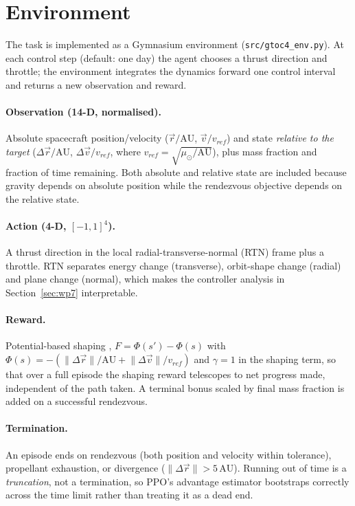 \section{Environment}
\label{sec:env}

The task is implemented as a Gymnasium environment (\texttt{src/gtoc4\_env.py}). At each control
step (default: one day) the agent chooses a thrust direction and throttle; the environment
integrates the dynamics forward one control interval and returns a new observation and reward.

\paragraph{Observation (14-D, normalised).} Absolute spacecraft position/velocity
($\vec r/\mathrm{AU}$, $\vec v/v_{ref}$) and state \emph{relative to the target}
($\Delta\vec r/\mathrm{AU}$, $\Delta\vec v/v_{ref}$, where $v_{ref}=\sqrt{\mu_\odot/\mathrm{AU}}$),
plus mass fraction and fraction of time remaining. Both absolute and relative state are included
because gravity depends on absolute position while the rendezvous objective depends on the
relative state.

\paragraph{Action (4-D, $[-1,1]^4$).} A thrust direction in the local radial-transverse-normal
(RTN) frame plus a throttle. RTN separates energy change (transverse), orbit-shape change
(radial) and plane change (normal), which makes the controller analysis in
Section~\ref{sec:wp7} interpretable.

\paragraph{Reward.} Potential-based shaping \parencite{ng1999policy},
$F = \Phi(s') - \Phi(s)$ with $\Phi(s) = -\left(\lVert\Delta\vec r\rVert/\mathrm{AU} +
\lVert\Delta\vec v\rVert/v_{ref}\right)$ and $\gamma=1$ in the shaping term, so that over a full
episode the shaping reward telescopes to net progress made, independent of the path taken. A
terminal bonus scaled by final mass fraction is added on a successful rendezvous.

\paragraph{Termination.} An episode ends on rendezvous (both position and velocity within
tolerance), propellant exhaustion, or divergence ($\lVert\Delta\vec r\rVert > 5\,\mathrm{AU}$).
Running out of time is a \emph{truncation}, not a termination, so PPO's advantage estimator
bootstraps correctly across the time limit rather than treating it as a dead end.

